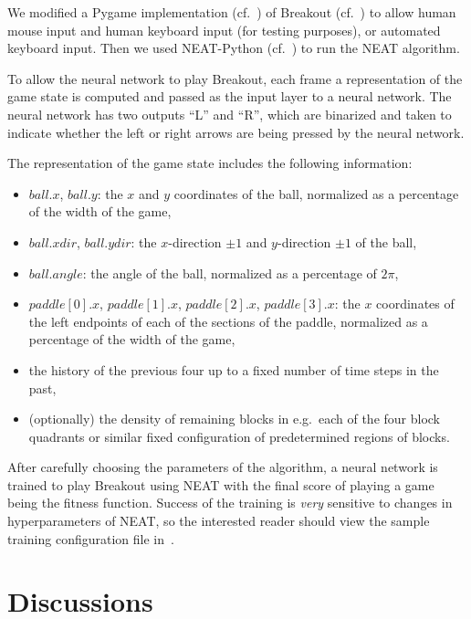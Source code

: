 \documentclass[letterpaper, twocolumn]{article}
\begin{document}
We modified a Pygame implementation (cf.~\cite{pygame}) of Breakout (cf.~\cite{max00355breakout}) to allow
human mouse input and human keyboard input (for testing purposes), or automated keyboard input.
Then we used NEAT-Python (cf.~\cite{neatpython}) to run the NEAT algorithm.

To allow the neural network to play Breakout,
each frame a representation of the game state is computed and
passed as the input layer to a neural network.
The neural network has two outputs ``L'' and ``R'', which are binarized
and taken to indicate whether the left or right arrows are being pressed by the neural network.

The representation of the game state includes the following information:
\begin{itemize}
    \item{} $ball.x$, $ball.y$: the $x$ and $y$ coordinates of the ball,
	    normalized as a percentage of the width of the game,
    \item{} $ball.xdir$, $ball.ydir$: the $x$-direction $\pm1$ and $y$-direction $\pm 1$ of the ball,
    \item{} $ball.angle$: the angle of the ball, normalized as a percentage of
	    $2\pi$,
    \item{} $paddle[0].x$, $paddle[1].x$, $paddle[2].x$, $paddle[3].x$: the $x$
	    coordinates of the left endpoints of each of the sections of
		the paddle, normalized as a percentage of the width of the
		game,
    \item{} the history of the previous four up to a fixed number of time steps
	    in the past,
    \item{} (optionally) the density of remaining blocks in e.g.\ each of the four block quadrants or similar fixed configuration of predetermined regions of blocks.
\end{itemize}

After carefully choosing the parameters of the algorithm, a neural network
is trained to play Breakout using NEAT with the final score of playing a game
being the fitness function.
Success of the training is \emph{very} sensitive to changes in hyperparameters
of NEAT, so the interested reader should view the sample training configuration
file in~\cite{neatbreakout}.

\section{Discussions}
\end{document}

